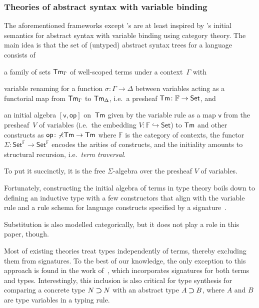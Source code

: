 \subsubsection{Theories of abstract syntax with variable binding}\label{sec:theory-of-syntax}
The aforementioned frameworks except \citeauthor{Gheri2020}'s are at least inspired by \citet{Fiore1999}'s initial semantics for abstract syntax with variable binding using category theory.
The main idea is that the set of (untyped) abstract syntax trees for a language consists of
\begin{enumerate*}
  \item a family of sets $\mathsf{Tm}_{\Gamma}$ of well-scoped terms under a context~$\Gamma$ with
  \item variable renaming for a function $\sigma\colon \Gamma \to \Delta$ between variables acting as a functorial map from $\mathsf{Tm}_{\Gamma}$ to $\mathsf{Tm}_{\Delta}$, i.e.\ a presheaf $\mathsf{Tm}\colon \mathbb{F} \to \mathsf{Set}$, and
  \item an initial algebra $[\mathsf{v}, \mathsf{op}]$ on~$\mathsf{Tm}$ given by the variable rule as a map $\mathsf{v}$ from the presheaf~$V$ of variables (i.e.\ the embedding $V\colon \mathbb{F} \hookrightarrow \mathsf{Set}$) to $\mathsf{Tm}$ and other constructs as $\mathsf{op}\colon \mathbb{\Sigma}\mathsf{Tm} \to \mathsf{Tm}$ where $\mathbb{F}$ is the category of contexts, the functor $\mathbb{\Sigma}\colon \mathsf{Set}^\mathbb{F} \to \mathsf{Set}^\mathbb{F}$ encodes the arities of constructs, and the initiality amounts to structural recursion, i.e.\ \emph{term traversal}.
\end{enumerate*}
To put it succinctly, it is the free $\mathbb{\Sigma}$-algebra over the presheaf $V$ of variables.

Fortunately, constructing the initial algebra of terms in type theory boils down to defining an inductive type with a few constructors that align with the variable rule and a rule schema for language constructs specified by a signature~\citep{Fiore2022}.

Substitution is also modelled categorically, but it does not play a role in this paper, though.

\begin{remark} \label{re:type-signature}
Most of existing theories treat types independently of terms, thereby excluding them from signatures.
To the best of our knowledge, the only exception to this approach is found in the work of~\citet{Arkor2020}, which incorporates signatures for both terms and types.
Interestingly, this inclusion is also critical for type synthesis for comparing a concrete type $N \mathbin{\bm{\supset}} N$ with an abstract type $A \mathbin{\bm{\supset}} B$, where $A$ and $B$ are type variables in a typing rule.
\end{remark}

